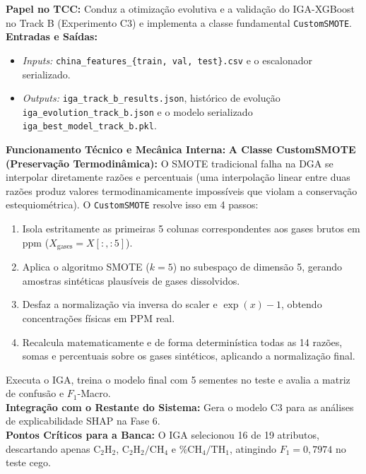 \documentclass[10pt,a4paper]{article}
\begin{document}
\begin{filebox}
\textbf{Papel no TCC:} Conduz a otimização evolutiva e a validação do IGA-XGBoost no Track B (Experimento C3) e implementa a classe fundamental \texttt{CustomSMOTE}.\\
\textbf{Entradas e Saídas:}
\begin{itemize}[leftmargin=*,itemsep=1pt]
  \item \textit{Inputs:} \texttt{china\_features\_\{train, val, test\}.csv} e o escalonador serializado.
  \item \textit{Outputs:} \texttt{iga\_track\_b\_results.json}, histórico de evolução \texttt{iga\_evolution\_track\_b.json} e o modelo serializado \texttt{iga\_best\_model\_track\_b.pkl}.
\end{itemize}
\textbf{Funcionamento Técnico e Mecânica Interna:} 
\textbf{A Classe CustomSMOTE (Preservação Termodinâmica):}
O SMOTE tradicional falha na DGA se interpolar diretamente razões e percentuais (uma interpolação linear entre duas razões produz valores termodinamicamente impossíveis que violam a conservação estequiométrica). O \texttt{CustomSMOTE} resolve isso em 4 passos:
\begin{enumerate}[leftmargin=*,itemsep=0pt]
  \item Isola estritamente as primeiras 5 colunas correspondentes aos gases brutos em ppm ($X_{\text{gases}} = X[:, :5]$).
  \item Aplica o algoritmo SMOTE ($k=5$) no subespaço de dimensão 5, gerando amostras sintéticas plausíveis de gases dissolvidos.
  \item Desfaz a normalização via inversa do scaler e $\exp(x)-1$, obtendo concentrações físicas em PPM real.
  \item Recalcula matematicamente e de forma determinística todas as 14 razões, somas e percentuais sobre os gases sintéticos, aplicando a normalização final.
\end{enumerate}
Executa o IGA, treina o modelo final com 5 sementes no teste e avalia a matriz de confusão e $F_1$-Macro.\\
\textbf{Integração com o Restante do Sistema:} Gera o modelo C3 para as análises de explicabilidade SHAP na Fase 6.\\
\textbf{Pontos Críticos para a Banca:} O IGA selecionou 16 de 19 atributos, descartando apenas $\text{C}_2\text{H}_2$, $\text{C}_2\text{H}_2/\text{CH}_4$ e $\%\text{CH}_4/\text{TH}_1$, atingindo $F_1 = 0,7974$ no teste cego.
\end{filebox}
\end{document}
